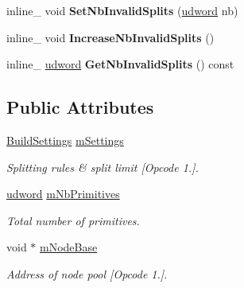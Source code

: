 \begin{DoxyCompactItemize}
\item 
\hypertarget{class_a_a_b_b_tree_builder_a2cec3a6a39e79e13b8cd152f0ef75351}{inline\+\_\+ void {\bfseries Set\+Nb\+Invalid\+Splits} (\hyperlink{_ice_types_8h_a44c6f1920ba5551225fb534f9d1a1733}{udword} nb)}\label{class_a_a_b_b_tree_builder_a2cec3a6a39e79e13b8cd152f0ef75351}

\item 
\hypertarget{class_a_a_b_b_tree_builder_adc8ad321e70d4fe79a98259ee40dab75}{inline\+\_\+ void {\bfseries Increase\+Nb\+Invalid\+Splits} ()}\label{class_a_a_b_b_tree_builder_adc8ad321e70d4fe79a98259ee40dab75}

\item 
\hypertarget{class_a_a_b_b_tree_builder_ad61e2640272e6c0ca2f73892f4ec82ee}{inline\+\_\+ \hyperlink{_ice_types_8h_a44c6f1920ba5551225fb534f9d1a1733}{udword} {\bfseries Get\+Nb\+Invalid\+Splits} () const }\label{class_a_a_b_b_tree_builder_ad61e2640272e6c0ca2f73892f4ec82ee}

\end{DoxyCompactItemize}
\subsection*{Public Attributes}
\begin{DoxyCompactItemize}
\item 
\hypertarget{class_a_a_b_b_tree_builder_a608e2b63c531582147797a44f797faab}{\hyperlink{struct_build_settings}{Build\+Settings} \hyperlink{class_a_a_b_b_tree_builder_a608e2b63c531582147797a44f797faab}{m\+Settings}}\label{class_a_a_b_b_tree_builder_a608e2b63c531582147797a44f797faab}

\begin{DoxyCompactList}\small\item\em Splitting rules \& split limit \mbox{[}Opcode 1.\mbox{]}. \end{DoxyCompactList}\item 
\hypertarget{class_a_a_b_b_tree_builder_a25a042f34509d0c94cbd2e825ed9eaca}{\hyperlink{_ice_types_8h_a44c6f1920ba5551225fb534f9d1a1733}{udword} \hyperlink{class_a_a_b_b_tree_builder_a25a042f34509d0c94cbd2e825ed9eaca}{m\+Nb\+Primitives}}\label{class_a_a_b_b_tree_builder_a25a042f34509d0c94cbd2e825ed9eaca}

\begin{DoxyCompactList}\small\item\em Total number of primitives. \end{DoxyCompactList}\item 
\hypertarget{class_a_a_b_b_tree_builder_a8f081024d14f27c49b6734d849f878a4}{void $\ast$ \hyperlink{class_a_a_b_b_tree_builder_a8f081024d14f27c49b6734d849f878a4}{m\+Node\+Base}}\label{class_a_a_b_b_tree_builder_a8f081024d14f27c49b6734d849f878a4}

\begin{DoxyCompactList}\small\item\em Address of node pool \mbox{[}Opcode 1.\mbox{]}. \end{DoxyCompactList}\end{DoxyCompactItemize}


